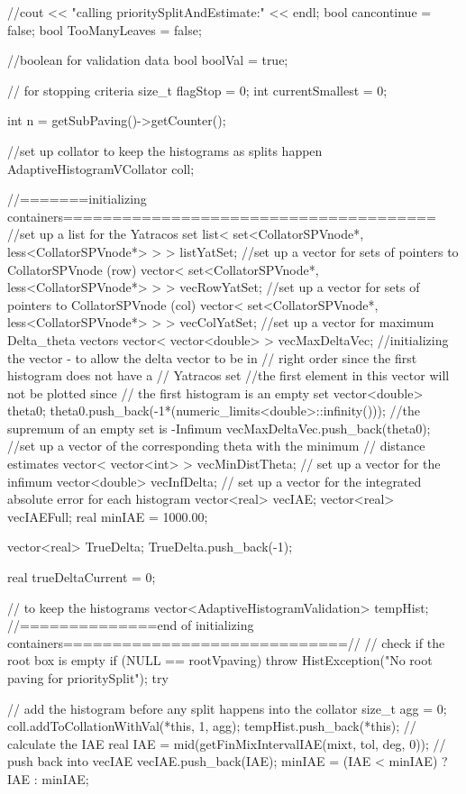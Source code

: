 \begin{DoxyCode}
{
    //cout << "calling prioritySplitAndEstimate:" << endl;
   bool cancontinue = false;
   bool TooManyLeaves = false;
   
    //boolean for validation data
    bool boolVal = true;
    
    // for stopping criteria
    size_t flagStop = 0;
    int currentSmallest = 0;
    
    int n = getSubPaving()->getCounter();
    
    //set up collator to keep the histograms as splits happen
    AdaptiveHistogramVCollator coll;
    
   //=======initializing containers======================================
  //set up a list for the Yatracos set 
  list< set<CollatorSPVnode*, less<CollatorSPVnode*> > > listYatSet;
  //set up a vector for sets of pointers to CollatorSPVnode (row)
  vector< set<CollatorSPVnode*, less<CollatorSPVnode*> > > vecRowYatSet;
  //set up a vector for sets of pointers to CollatorSPVnode (col)
  vector< set<CollatorSPVnode*, less<CollatorSPVnode*> > > vecColYatSet;    
  //set up a vector for maximum Delta_theta vectors
  vector< vector<double> > vecMaxDeltaVec;
  //initializing the vector - to allow the delta vector to be in 
  // right order  since the first histogram does not have a 
  // Yatracos set
  //the first element in this vector will not be plotted since 
  // the first histogram is an empty set
  vector<double> theta0;
  theta0.push_back(-1*(numeric_limits<double>::infinity())); 
  //the supremum of an empty set is -Infimum 
  vecMaxDeltaVec.push_back(theta0);
  //set up a vector of the corresponding theta with the minimum 
  // distance estimates
  vector< vector<int> > vecMinDistTheta;
  // set up a vector for the infimum 
  vector<double> vecInfDelta;
  // set up a vector for the integrated absolute error for each histogram
   vector<real> vecIAE; 
   vector<real> vecIAEFull;
   real minIAE = 1000.00;
   
   vector<real> TrueDelta;
   TrueDelta.push_back(-1); 
   
   real trueDeltaCurrent = 0;
   
   // to keep the histograms
   vector<AdaptiveHistogramValidation> tempHist;
   //==============end of initializing
       containers=============================//   
   // check if the root box is empty
    if (NULL == rootVpaving) {
            throw HistException("No root paving for prioritySplit");
    }
    try {       
        // add the histogram before any split happens into the collator
        size_t agg = 0;
      coll.addToCollationWithVal(*this, 1, agg);
      tempHist.push_back(*this);
      // calculate the IAE 
      real IAE = mid(getFinMixIntervalIAE(mixt, tol, deg, 0));
      // push back into vecIAE 
      vecIAE.push_back(IAE);
      minIAE = (IAE < minIAE) ? IAE : minIAE;
      
}}
\end{DoxyCode}
